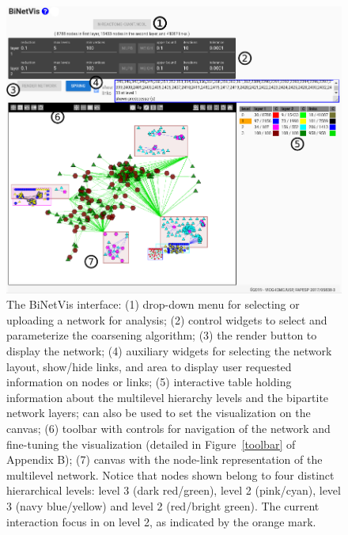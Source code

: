\documentclass[runningheads]{llncs}
\begin{document}
\begin{figure}\centering
 \includegraphics[width=\textwidth]{overall2_}
  \caption{The BiNetVis interface: (1) drop-down menu for selecting or uploading a network for analysis;
  (2) control widgets to select and parameterize the coarsening algorithm;  (3) the render button to display the network; (4) auxiliary widgets for selecting the network layout, show/hide links, and area to display user requested information on nodes or links; (5) interactive table holding information about the multilevel hierarchy levels and the bipartite network layers; can also be used to set the visualization on the canvas; (6) toolbar with controls for navigation of the network and fine-tuning the visualization (detailed in Figure~\ref{toolbar} of Appendix B); (7) canvas with the node-link representation of the multilevel network. Notice that nodes shown belong to four distinct hierarchical levels: level 3 (dark red/green), level 2 (pink/cyan), level 3 (navy blue/yellow) and level 2 (red/bright green). The current interaction focus in on level 2, as indicated by the orange mark. 
  }\label{fpage0}
\end{figure}
\end{document}
